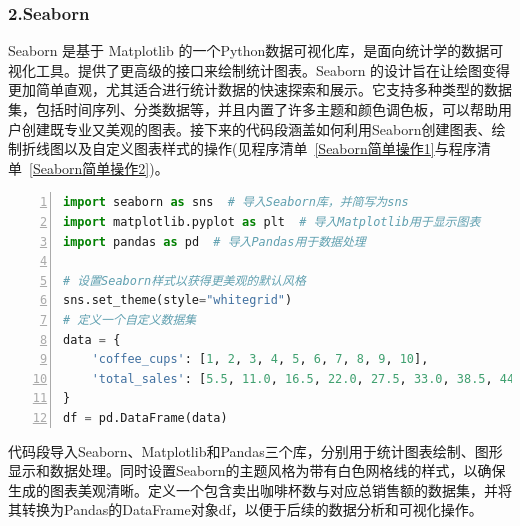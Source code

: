 \subsubsection{2.Seaborn}

Seaborn 是基于 Matplotlib 的一个Python数据可视化库，是面向统计学的数据可视化工具。提供了更高级的接口来绘制统计图表。Seaborn 的设计旨在让绘图变得更加简单直观，尤其适合进行统计数据的快速探索和展示。它支持多种类型的数据集，包括时间序列、分类数据等，并且内置了许多主题和颜色调色板，可以帮助用户创建既专业又美观的图表。接下来的代码段涵盖如何利用Seaborn创建图表、绘制折线图以及自定义图表样式的操作(见程序清单~\ref{Seaborn简单操作1}与程序清单~\ref{Seaborn简单操作2})。

\begin{lstlisting}[language={python},label={Seaborn简单操作1},caption={Seaborn简单操作1}, basicstyle=\footnotesize\ttfamily, breaklines=true, numbers=left, frame=single]
import seaborn as sns  # 导入Seaborn库，并简写为sns
import matplotlib.pyplot as plt  # 导入Matplotlib用于显示图表
import pandas as pd  # 导入Pandas用于数据处理

# 设置Seaborn样式以获得更美观的默认风格
sns.set_theme(style="whitegrid")
# 定义一个自定义数据集
data = {
    'coffee_cups': [1, 2, 3, 4, 5, 6, 7, 8, 9, 10],
    'total_sales': [5.5, 11.0, 16.5, 22.0, 27.5, 33.0, 38.5, 44.0, 49.5, 55.0]
}
df = pd.DataFrame(data)

\end{lstlisting}
代码段导入Seaborn、Matplotlib和Pandas三个库，分别用于统计图表绘制、图形显示和数据处理。同时设置Seaborn的主题风格为带有白色网格线的样式，以确保生成的图表美观清晰。定义一个包含卖出咖啡杯数与对应总销售额的数据集，并将其转换为Pandas的DataFrame对象df，以便于后续的数据分析和可视化操作。

